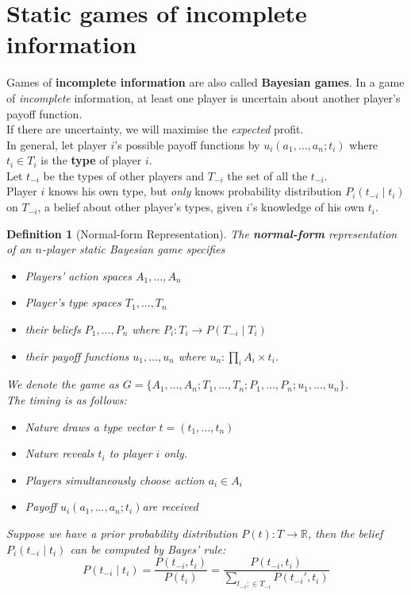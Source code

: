 \documentclass[12pt]{article}
\newtheorem{definition}{Definition}[section]
\theoremstyle{definition}
\begin{document}
\section{Static games of incomplete information}
Games of \textbf{incomplete information} are also called \textbf{Bayesian games}. In a game of \textit{incomplete} information, at least one player is uncertain about another player's payoff function.\\
If there are uncertainty, we will maximise the \textit{expected} profit.\\
In general, let player $i$'s possible payoff functions by $u_i(a_1,\ldots, a_n; t_i)$ where $t_i\in T_i$ is the \textbf{type} of player $i$.\\
Let $t_{-i}$ be the types of other players and $T_{-i}$ the set of all the $t_{-i}$.\\
Player $i$ knows his own type, but \textit{only} knows probability distribution $P_i(t_{-i}\mid t_i)$ on $T_{-i}$, a belief about other player's types, given $i$'s knowledge of his own $t_i$.
\begin{definition}[Normal-form Representation]
\normalfont The \textbf{normal-form} representation of an $n$-player static Bayesian game specifies
\begin{itemize}
  \item Players' action spaces $A_1,\ldots, A_n$
  \item Player's type spaces $T_1,\ldots, T_n$
  \item their beliefs $P_1,\ldots, P_n$ where $P_i: T_i\to P(T_{-i}\mid T_i)$
  \item their payoff functions $u_1,\ldots, u_n$ where $u_n:\prod_i A_i \times t_i$.
\end{itemize}
We denote the game as $G=\{A_1,\ldots, A_n; T_1,\ldots, T_n; P_1,\ldots, P_n; u_1,\ldots, u_n\}$.\\
The timing is as follows:
\begin{itemize}
  \item Nature draws a type vector $t=(t_1,\ldots, t_n)$
  \item Nature reveals $t_i$ to player $i$ only.
  \item Players simultaneously choose action $a_i\in A_i$
  \item Payoff $u_i(a_1,\ldots, a_n; t_i)$are received
\end{itemize}
Suppose we have a prior probability distribution $P(t): T \to \mathbb{R}$, then the belief $P_i(t_{-i}\mid t_i)$ can be computed by Bayes' rule:
\[
P(t_{-i}\mid t_i) =\frac{P(t_{-i}, t_i)}{P(t_i)}=\frac{P(t_{-i},t_i)}{\sum_{t_{-i};\in T_{-i}}P(t_{-i}', t_i)}
\]
\end{definition}
\end{document}
